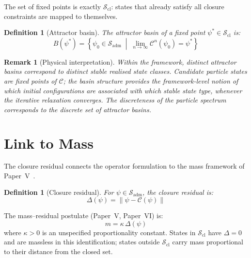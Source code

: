 \documentclass[12pt]{article}
\newtheorem{definition}[theorem]{Definition}
\newtheorem{remark}[theorem]{Remark}
\newcommand{\Ccal}{\mathcal{C}}
\newcommand{\Sadm}{\mathcal{S}_{\mathrm{adm}}}
\newcommand{\Scl}{\mathcal{S}_{\mathrm{cl}}}
\begin{document}
The set of fixed points is exactly $\Scl$: states that already satisfy all closure constraints are mapped to themselves.

\begin{definition}[Attractor basin]\label{def:basin}
The attractor basin of a fixed point $\psi^* \in \Scl$ is:
\begin{equation}
    B(\psi^*) = \left\{\psi_0 \in \Sadm \;\middle|\; \lim_{n \to \infty} \Ccal^n(\psi_0) = \psi^*\right\}
\end{equation}
\end{definition}

\begin{remark}[Physical interpretation]
Within the framework, distinct attractor basins correspond to distinct stable realised state classes. Candidate particle states are fixed points of $\Ccal$; the basin structure provides the framework-level notion of which initial configurations are associated with which stable state type, whenever the iterative relaxation converges. The discreteness of the particle spectrum corresponds to the discrete set of attractor basins.
\end{remark}

\section{Link to Mass}\label{sec:mass}

The closure residual connects the operator formulation to the mass framework of Paper~V~\citep{SmartV}.

\begin{definition}[Closure residual]\label{def:residual}
For $\psi \in \Sadm$, the closure residual is:
\begin{equation}
    \Delta(\psi) = \|\psi - \Ccal(\psi)\|
\end{equation}
\end{definition}

The mass--residual postulate (Paper~V, Paper~VI) is:
\begin{equation}
    m = \kappa\, \Delta(\psi)
\end{equation}
where $\kappa > 0$ is an unspecified proportionality constant. States in $\Scl$ have $\Delta = 0$ and are massless in this identification; states outside $\Scl$ carry mass proportional to their distance from the closed set.
\end{document}
